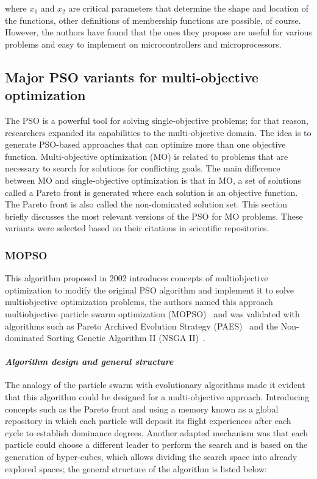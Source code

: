 where $x_1$ and $x_2$ are critical parameters that determine the shape and location of the functions, other definitions of membership functions are possible, of course. However, the authors have found that the ones they propose are useful for various problems and easy to implement on microcontrollers and microprocessors.

\subsection{Major PSO variants for multi-objective optimization}
\label{sec:variants2}

The PSO is a powerful tool for solving single-objective problems; for that reason, researchers expanded its capabilities to the multi-objective domain. The idea is to generate PSO-based approaches that can optimize more than one objective function. Multi-objective optimization (MO) is related to problems that are necessary to search for solutions for conflicting goals. The main difference between MO and single-objective optimization is that in MO, a set of solutions called a Pareto front is generated where each solution is an objective function\cite{coello2007evolutionary}. The Pareto front is also called the non-dominated solution set. This section briefly discusses the most relevant versions of the PSO for MO problems. These variants were selected based on their citations in scientific repositories.

\subsubsection{MOPSO} 

This algorithm proposed in 2002 introduces concepts of multiobjective optimization to modify the original PSO algorithm and implement it to solve multiobjective optimization problems, the authors named this approach multiobjective particle swarm optimization (MOPSO)~\cite{coello2002mopso} and was validated with algorithms such as Pareto Archived Evolution Strategy (PAES)~\cite{knowles1999pareto} and the Non-dominated Sorting Genetic Algorithm II (NSGA II)~\cite{deb2000fast}.

\paragraph{\textit{Algorithm design and general structure}}

The analogy of the particle swarm with evolutionary algorithms made it evident that this algorithm could be designed for a multi-objective approach. Introducing concepts such as the Pareto front and using a memory known as a global repository in which each particle will deposit its flight experiences after each cycle to establish dominance degrees.
Another adapted mechanism was that each particle could choose a different leader to perform the search and is based on the generation of hyper-cubes, which allows dividing the search space into already explored spaces; the general structure of the algorithm is listed below:


